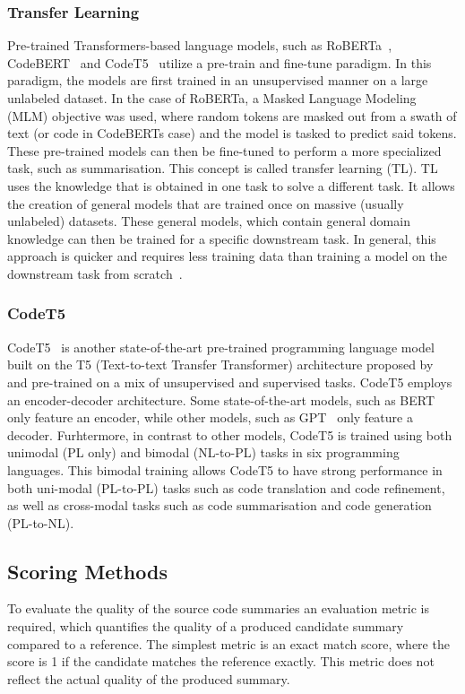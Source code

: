 \subsubsection{Transfer Learning}
Pre-trained Transformers-based language models, such as RoBERTa~\cite{roberta}, CodeBERT~\cite{CodeBERT} and CodeT5~\cite{CodeT5} utilize a pre-train and fine-tune paradigm. In this paradigm, the models are first trained in an unsupervised manner on a large unlabeled dataset. In the case of RoBERTa, a Masked Language Modeling (MLM) objective was used, where random tokens are masked out from a swath of text (or code in CodeBERTs case) and the model is tasked to predict said tokens. These pre-trained models can then be fine-tuned to perform a more specialized task, such as summarisation. This concept is called transfer learning (TL). 
TL uses the knowledge that is obtained in one task to solve a different task. It allows the creation of general models that are trained once on massive (usually unlabeled) datasets. These general models, which contain general domain knowledge can then be trained for a specific downstream task. In general, this approach is quicker and requires less training data than training a model on the downstream task from scratch~\cite{BERT}.

\subsubsection{CodeT5}
CodeT5~\cite{CodeT5} is another state-of-the-art pre-trained programming language model built on the T5 (Text-to-text Transfer Transformer) architecture proposed by~\citeauthor{CodeT5} and pre-trained on a mix of unsupervised and supervised tasks. CodeT5 employs an encoder-decoder architecture. Some state-of-the-art models, such as BERT~\cite{BERT} only feature an encoder, while other models, such as GPT~\cite{GPT3} only feature a decoder.
Furhtermore, in contrast to other models, CodeT5 is trained using both unimodal (PL only) and bimodal (NL-to-PL) tasks in six programming languages. This bimodal training allows CodeT5 to have strong performance in both uni-modal (PL-to-PL) tasks such as code translation and code refinement, as well as cross-modal tasks such as code summarisation and code generation (PL-to-NL).

\subsection{Scoring Methods}
To evaluate the quality of the source code summaries an evaluation metric is required, which quantifies the quality of a produced candidate summary compared to a reference. The simplest metric is an exact match score, where the score is 1 if the candidate matches the reference exactly. This metric does not reflect the actual quality of the produced summary.

